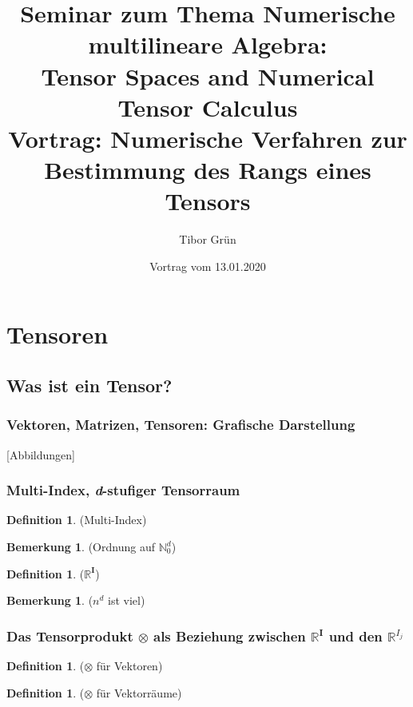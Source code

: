 \documentclass[11pt]{article} %
\title{\LARGE Seminar zum Thema Numerische multilineare Algebra:\\
\LARGE Tensor Spaces and Numerical Tensor Calculus\\
\vspace{5mm} %
\large Vortrag: Numerische Verfahren zur Bestimmung des Rangs eines Tensors}
\date{Vortrag vom 13.01.2020}
\author{Tibor Gr{\"u}n}
\theoremstyle{definition}
\newtheorem{definition}[thm]{Definition}
\newtheorem{rmk}[thm]{Bemerkung}
\begin{document}
\maketitle

\section{Tensoren}

\subsection{Was ist ein Tensor?}

\subsubsection{Vektoren, Matrizen, Tensoren: Grafische Darstellung}

[Abbildungen]

\subsubsection{Multi-Index, \textit{d}-stufiger Tensorraum}

\begin{definition} (Multi-Index)
\end{definition}

\begin{rmk} (Ordnung auf $\mathbb{N}_{0}^{d}$)
\end{rmk}

\begin{definition} ($\mathbb{R}^{\mathbf{I}}$)
\end{definition}

\begin{rmk} ($n^{d}$ ist viel)
\end{rmk}

\subsubsection{Das Tensorprodukt $\otimes$ als Beziehung zwischen $\mathbb{R}^{\mathbf{I}}$ und den $\mathbb{R}^{I_{j}}$}

\begin{definition} ($\otimes$ für Vektoren)
\end{definition}

\begin{definition} ($\otimes$ für Vektorräume)
\end{definition}
\end{document}
